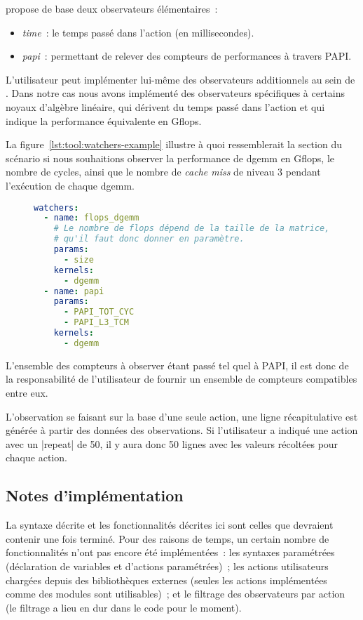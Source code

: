 \outil propose de base deux observateurs élémentaires~:

\begin{itemize}
  \item \emph{time}~: le temps passé dans l'action (en millisecondes).
  \item \emph{papi}~: permettant de relever des compteurs de performances à travers PAPI.
\end{itemize}

L'utilisateur peut implémenter lui-même des observateurs additionnels au sein de \outil.
Dans notre cas nous avons implémenté des observateurs spécifiques à certains noyaux d'algèbre linéaire, qui dérivent du temps passé dans l'action et qui indique la performance équivalente en Gflops.

La figure~\ref{lst:tool:watchers-example} illustre à quoi ressemblerait la section du scénario si nous souhaitions observer la performance de dgemm en Gflops, le nombre de cycles, ainsi que le nombre de \emph{cache miss} de niveau 3 pendant l'exécution de chaque dgemm.

\begin{figure}[h!]
\begin{lstlisting}[language=yaml,caption=Exemple de déclaration d'observateurs,label=lst:tool:watchers-example]
watchers:
  - name: flops_dgemm
    # Le nombre de flops dépend de la taille de la matrice,
    # qu'il faut donc donner en paramètre.
    params:
      - size
    kernels:
      - dgemm
  - name: papi
    params:
      - PAPI_TOT_CYC
      - PAPI_L3_TCM
    kernels:
      - dgemm
\end{lstlisting}
\end{figure}

L'ensemble des compteurs à observer étant passé tel quel à PAPI, il est donc de la responsabilité de l'utilisateur de fournir un ensemble de compteurs compatibles entre eux.

L'observation se faisant sur la base d'une seule action, une ligne récapitulative est générée à partir des données des observations.
Si l'utilisateur a indiqué une action avec un |repeat| de 50, il y aura donc 50 lignes avec les valeurs récoltées pour chaque action.

\subsection{Notes d'implémentation}

La syntaxe décrite et les fonctionnalités décrites ici sont celles que devraient contenir \outil une fois terminé.
Pour des raisons de temps, un certain nombre de fonctionnalités n'ont pas encore été implémentées~: les syntaxes paramétrées (déclaration de variables et d'actions paramétrées)~; les actions utilisateurs chargées depuis des bibliothèques externes (seules les actions implémentées comme des modules sont utilisables)~; et le filtrage des observateurs par action (le filtrage a lieu en dur dans le code pour le moment).

